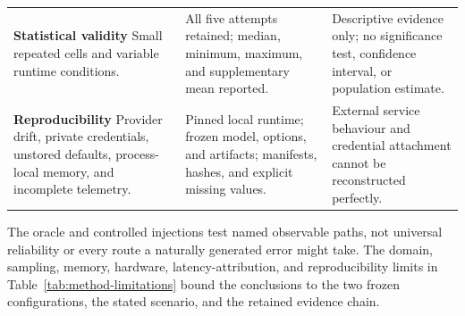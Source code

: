 \begin{table}[htbp]
\begin{tabularx}{\textwidth}{
  @{}
  L{0.25\textwidth}
  L{0.34\textwidth}
  Y
  @{}
}
\textbf{Statistical validity}\newline
Small repeated cells and variable runtime conditions.
&
All five attempts retained; median, minimum, maximum, and supplementary
mean reported.
&
Descriptive evidence only; no significance test, confidence interval,
or population estimate.
\\
\addlinespace[2pt]

\textbf{Reproducibility}\newline
Provider drift, private credentials, unstored defaults, process-local
memory, and incomplete telemetry.
&
Pinned local runtime; frozen model, options, and artifacts; manifests,
hashes, and explicit missing values.
&
External service behaviour and credential attachment cannot be
reconstructed perfectly.
\\

\bottomrule
\end{tabularx}
\endgroup
\end{table}

The oracle and controlled injections test named observable paths, not universal
reliability or every route a naturally generated error might take. The domain,
sampling, memory, hardware, latency-attribution, and reproducibility limits in
Table~\ref{tab:method-limitations} bound the conclusions to the two frozen
configurations, the stated scenario, and the retained evidence chain.

\setlength{\emergencystretch}{0pt}
